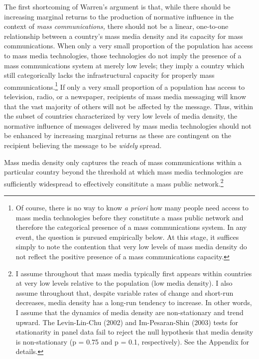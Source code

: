 \documentclass[11pt,article,oneside]{memoir}
\begin{document}
The first shortcoming of Warren's argument is that, while there should
be increasing marginal returns to the production of normative influence
in the context of \emph{mass communications,} there should not be a
linear, one-to-one relationship between a country's mass media density
and its capacity for mass communications. When only a very small
proportion of the population has access to mass media technologies,
those technologies do not imply the presence of a mass communications
system at merely low levels; they imply a country which still
categorically lacks the infrastructural capacity for properly mass
communications.\footnote{Of course, there is no way to know \emph{a
  priori} how many people need access to mass media technologies before
  they constitute a mass public network and therefore the categorical
  presence of a mass communications system. In any event, the question
  is pursued empirically below. At this stage, it suffices simply to
  note the contention that very low levels of mass media density do not
  reflect the positive presence of a mass communications capacity.} If
only a very small proportion of a population has access to television,
radio, or a newspaper, recipients of mass media messaging will know that
the vast majority of others will not be affected by the message. Thus,
within the subset of countries characterized by very low levels of media
density, the normative influence of messages delivered by mass media
technologies should not be enhanced by increasing marginal returns as
these are contingent on the recipient believing the message to be
\emph{widely} spread.

Mass media density only captures the reach of mass communications within
a particular country beyond the threshold at which mass media
technologies are sufficiently widespread to effectively consititute a
mass public network.\footnote{I assume throughout that mass media
  typically first appears within countries at very low levels relative
  to the population (low media density). I also assume throughout that,
  despite variable rates of change and short-run decreases, media
  density has a long-run tendency to increase. In other words, I assume
  that the dynamics of media density are non-stationary and trend
  upward. The Levin-Lin-Chu (2002) and Im-Pesaran-Shin (2003) tests for
  stationarity in panel data fail to reject the null hypothesis that
  media density is non-stationary (p = 0.75 and p = 0.1, respectively).
  See the Appendix for details.}
\end{document}
